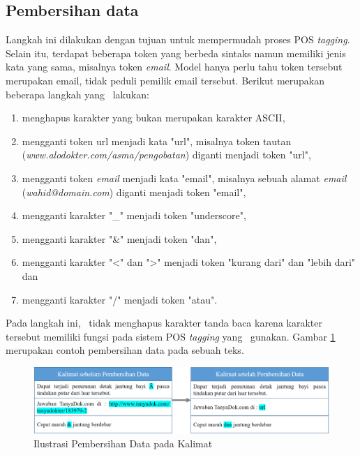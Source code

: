 \subsection{Pembersihan data}
Langkah ini dilakukan dengan tujuan untuk mempermudah proses POS \textit{tagging}. Selain itu, terdapat beberapa token yang berbeda sintaks namun memiliki jenis kata yang sama, misalnya token \textit{email}. Model hanya perlu tahu token tersebut merupakan email, tidak peduli pemilik email tersebut. Berikut merupakan beberapa langkah yang \saya~lakukan:
	
\begin{enumerate}
	\item menghapus karakter yang bukan merupakan karakter ASCII,
	\item mengganti token url menjadi kata "url", misalnya token tautan (\textit{www.alodokter.com/asma/pengobatan}) diganti menjadi token "url",
	\item mengganti token \textit{email} menjadi kata "email", misalnya sebuah alamat \textit{email} (\textit{wahid@domain.com}) diganti menjadi token "email",
	\item mengganti karakter "\_" menjadi token "underscore",
	\item mengganti karakter "\&" menjadi token "dan",
	\item mengganti karakter "\textless" dan "\textgreater" menjadi token "kurang dari" dan "lebih dari" dan
	\item mengganti karakter "/" menjadi token "atau".
\end{enumerate}
Pada langkah ini, \saya~tidak menghapus karakter tanda baca karena karakter tersebut memiliki fungsi pada sistem POS \textit{tagging} yang \saya~gunakan. Gambar \ref{fig:pembersihandata} merupakan contoh pembersihan data pada sebuah teks.
\begin{figure}
	\centering
	\includegraphics[width=\linewidth]{images/pembersihandata}
	\caption{Ilustrasi Pembersihan Data pada Kalimat}
	\label{fig:pembersihandata}
\end{figure}

	
